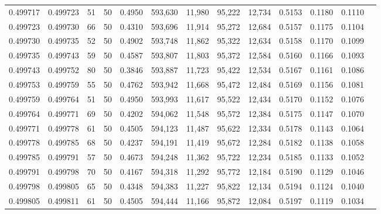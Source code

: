 \begin{tabular}{rrrrrrrrrrrrr}
0.499717 & 0.499723 &    51 &  50 &                                     0.4950 & 593,630 &  11,980 &  95,222 &  12,734 & 0.5153 & 0.1180 & 0.1110 \\
0.499723 & 0.499730 &    66 &  50 &                                     0.4310 & 593,696 &  11,914 &  95,272 &  12,684 & 0.5157 & 0.1175 & 0.1104 \\
0.499730 & 0.499735 &    52 &  50 &                                     0.4902 & 593,748 &  11,862 &  95,322 &  12,634 & 0.5158 & 0.1170 & 0.1099 \\
0.499735 & 0.499743 &    59 &  50 &                                     0.4587 & 593,807 &  11,803 &  95,372 &  12,584 & 0.5160 & 0.1166 & 0.1093 \\
0.499743 & 0.499752 &    80 &  50 &                                     0.3846 & 593,887 &  11,723 &  95,422 &  12,534 & 0.5167 & 0.1161 & 0.1086 \\
0.499753 & 0.499759 &    55 &  50 &                                     0.4762 & 593,942 &  11,668 &  95,472 &  12,484 & 0.5169 & 0.1156 & 0.1081 \\
0.499759 & 0.499764 &    51 &  50 &                                     0.4950 & 593,993 &  11,617 &  95,522 &  12,434 & 0.5170 & 0.1152 & 0.1076 \\
0.499764 & 0.499771 &    69 &  50 &                                     0.4202 & 594,062 &  11,548 &  95,572 &  12,384 & 0.5175 & 0.1147 & 0.1070 \\
0.499771 & 0.499778 &    61 &  50 &                                     0.4505 & 594,123 &  11,487 &  95,622 &  12,334 & 0.5178 & 0.1143 & 0.1064 \\
0.499778 & 0.499785 &    68 &  50 &                                     0.4237 & 594,191 &  11,419 &  95,672 &  12,284 & 0.5182 & 0.1138 & 0.1058 \\
0.499785 & 0.499791 &    57 &  50 &                                     0.4673 & 594,248 &  11,362 &  95,722 &  12,234 & 0.5185 & 0.1133 & 0.1052 \\
0.499791 & 0.499798 &    70 &  50 &                                     0.4167 & 594,318 &  11,292 &  95,772 &  12,184 & 0.5190 & 0.1129 & 0.1046 \\
0.499798 & 0.499805 &    65 &  50 &                                     0.4348 & 594,383 &  11,227 &  95,822 &  12,134 & 0.5194 & 0.1124 & 0.1040 \\
0.499805 & 0.499811 &    61 &  50 &                                     0.4505 & 594,444 &  11,166 &  95,872 &  12,084 & 0.5197 & 0.1119 & 0.1034 \\

\end{tabular}
